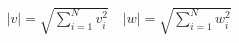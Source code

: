 \documentclass[preview]{standalone}
\begin{document}
\begin{align*}
|v| = \sqrt{\sum_{i=1}^{N} v_i^2} \quad |w| = \sqrt{\sum_{i=1}^{N} w_i^2}
\end{align*}
\end{document}
